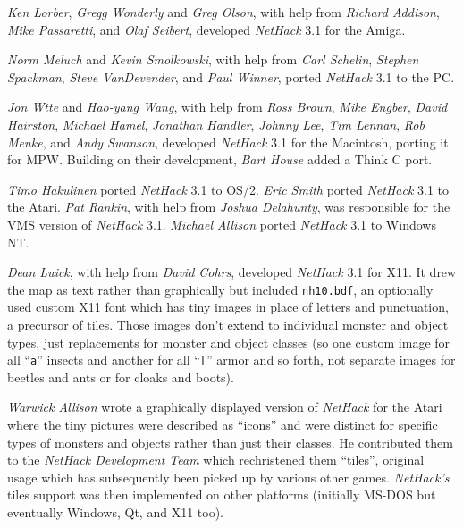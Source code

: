 \documentclass[titlepage]{article}
\begin{document}
\medskip
\noindent \textit{Ken Lorber}, \textit{Gregg Wonderly} and \textit{Greg Olson}, with help
from \textit{Richard Addison}, \textit{Mike Passaretti}, and \textit{Olaf Seibert},
developed \textit{NetHack} 3.1 for the Amiga.

\medskip
\noindent \textit{Norm Meluch} and \textit{Kevin Smolkowski}, with help from
\textit{Carl Schelin}, \textit{Stephen Spackman}, \textit{Steve VanDevender},
and \textit{Paul Winner}, ported \textit{NetHack} 3.1 to the PC.

\medskip
\noindent \textit{Jon W\textbraceleft tte} and \textit{Hao-yang Wang},
with help from \textit{Ross Brown}, \textit{Mike Engber}, \textit{David Hairston},
\textit{Michael Hamel}, \textit{Jonathan Handler}, \textit{Johnny Lee},
\textit{Tim Lennan}, \textit{Rob Menke}, and \textit{Andy Swanson},
developed \textit{NetHack} 3.1 for the Macintosh, porting it for MPW.
Building on their development, \textit{Bart House} added a Think C port.

\medskip
\noindent \textit{Timo Hakulinen} ported \textit{NetHack} 3.1 to OS/2.
\textit{Eric Smith} ported \textit{NetHack} 3.1 to the Atari.
\textit{Pat Rankin}, with help from \textit{Joshua Delahunty},
was responsible for the VMS version of \textit{NetHack} 3.1.
\textit{Michael Allison} ported \textit{NetHack} 3.1 to Windows NT.

\medskip
\noindent \textit{Dean Luick}, with help from \textit{David Cohrs}, developed
\textit{NetHack} 3.1 for X11.
It drew the map as text rather than graphically but
included \texttt{nh10.bdf}, an optionally used custom X11 font which has
tiny images in place of letters and punctuation, a precursor of tiles.
Those images don't extend to individual monster and object types, just
replacements for monster and object classes (so one custom image for all
``\texttt{a}'' insects and another for all ``\texttt{[}'' armor and so
forth, not separate images for beetles and ants or for cloaks and boots).

\medskip
\noindent \textit{Warwick Allison} wrote a graphically displayed version
of \textit{NetHack}
for the Atari where the tiny pictures were described as ``icons'' and
were distinct for specific types of monsters and objects rather than just
their classes.
He contributed them to the \textit{NetHack Development Team} which
rechristened them ``tiles'', original usage which has subsequently been
picked up by various other games.
\textit{NetHack's} tiles support was then implemented on other platforms
(initially MS-DOS but eventually Windows, Qt, and X11 too).
\end{document}
